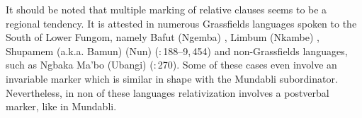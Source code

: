 \documentclass[10pt,twoside]{article}
\def\ci#1{{\ipaFont #1}}
\newcommand{\gl}[1]{`#1'}
\newcommand{\citepp}[2]{(\citealp{#1}:\,{#2})}
\newcommand{\comment}[1]{\textcolor{blue}{\emph{#1}}}
\begin{document}
It should be noted that multiple marking of relative clauses seems 
to be a regional tendency. It is attested in numerous Grassfields languages spoken to the 
South of Lower Fungom, namely Bafut (Ngemba) \citep{tamanji:2009}, Limbum (Nkambe) 
\citep{fransen:1995}, Shupamem (a.k.a. Bamun) (Nun) \citepp{nchare:2012}{188--9,\,454} and 
non-Grassfields languages, such as Ngbaka Ma'bo (Ubangi) \citepp{thomas:1963}{270}. Some 
of these cases even involve an invariable marker which is similar in shape with the Mundabli subordinator. Nevertheless, in non of these languages relativization involves a postverbal marker, like in Mundabli.
%
%
%
\end{document}
